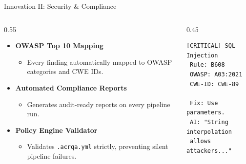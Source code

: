 \documentclass[aspectratio=169, 10pt]{beamer}
\begin{document}
\begin{frame}[fragile]{Innovation II: Security \& Compliance}
  \begin{columns}[T]
    \begin{column}{0.55\textwidth}
      \begin{itemize}\setlength\itemsep{1em}
        \item \textbf{OWASP Top 10 Mapping}
          \begin{itemize}
            \item Every finding automatically mapped to OWASP categories and CWE IDs.
          \end{itemize}
        \item \textbf{Automated Compliance Reports}
          \begin{itemize}
            \item Generates audit-ready reports on every pipeline run.
          \end{itemize}
        \item \textbf{Policy Engine Validator}
          \begin{itemize}
            \item Validates \texttt{.acrqa.yml} strictly, preventing silent pipeline failures.
          \end{itemize}
      \end{itemize}
    \end{column}
    \begin{column}{0.45\textwidth}
      \begin{tcolorbox}[colback=acrNavy,title={\textbf{Security Output}},coltext=white]
\begin{lstlisting}[style=shellstyle]
[CRITICAL] SQL Injection
 Rule: B608
 OWASP: A03:2021
 CWE-ID: CWE-89

 Fix: Use parameters.
 AI: "String interpolation
 allows attackers..."
\end{lstlisting}
      \end{tcolorbox}
    \end{column}
  \end{columns}
\end{frame}
\end{document}

